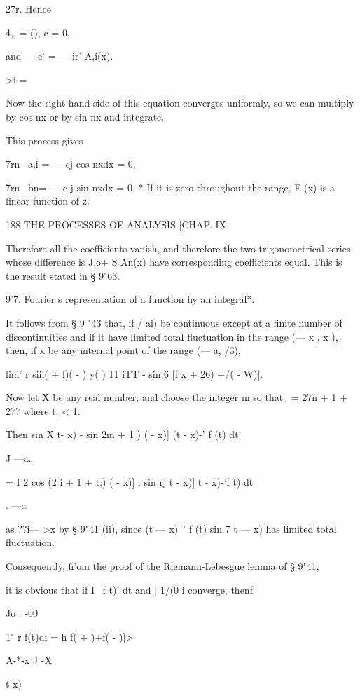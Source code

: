{27r. Hence

 4,, = (), c = 0,

and — c' = — ir'-A,i(x).

>i = \

Now the right-hand side of this equation converges uniformly, so we
can multiply by cos nx or by sin nx and integrate.

This process gives

7rn~-a,i = — cj cos nxdx = 0,

7rn~ bn= — c j sin nxdx = 0. * If it is zero throughout the range, F
(x) is a linear function of z.



188 THE PROCESSES OF ANALYSIS [CHAP. IX

Therefore all the coefficients vanish, and therefore the two
trigonometrical series whose difference is J.o+ S An(x) have
corresponding coefficients equal. This is the result stated in § 9"63.

9'7. Fourier s representation of a function hy an integral*.

It follows from § 9 "43 that, if / ai) be continuous except at a
finite number of discontinuities and if it have limited total
fluctuation in the range (— x , x ), then, if x be any internal point
of the range (— a, /3),

lim' r siii( + l)( - ) y( ) 11 iTT - sin 6 [f x + 26) +/( - W)].

Now let X be any real number, and choose the integer m so that \ = 27n
+ 1 + 277 where t; < 1.

Then sin X t- x) - sin 2m + 1 ) ( - x)] (t - x)-' f (t) dt

J —a.

= I 2 cos (2 i + 1 + t;) ( - x)] . sin rj t - x)] t - x)-'f t) dt

. —a

as ??i— >x by § 9"41 (ii), since (t — x)~' f (t) sin 7 t — x) has
limited total fluctuation.

Consequently, fi'om the proof of the Riemann-Lebesgue lemma of § 9"41,

it is obvious that if I \ f t)' dt and | 1/(0 i converge, thenf

Jo . -00



1" r f(t)di = h f( + )+f( - )]>



A-*-x J -X



 t-x)



}

